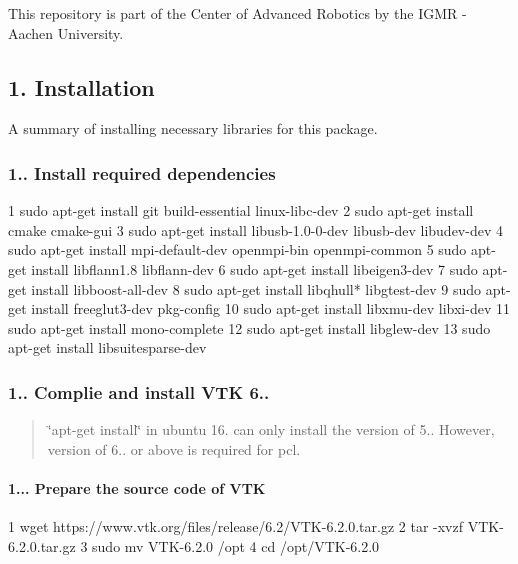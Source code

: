  This repository is part of the Center of Advanced Robotics by the I\+G\+MR -\/ Aachen University. 



\subsection*{1. Installation}

A summary of installing necessary libraries for this package. 



\subsubsection*{1.. Install required dependencies}


\begin{DoxyCode}
1 sudo apt-get install git build-essential linux-libc-dev
2 sudo apt-get install cmake cmake-gui
3 sudo apt-get install libusb-1.0-0-dev libusb-dev libudev-dev
4 sudo apt-get install mpi-default-dev openmpi-bin openmpi-common
5 sudo apt-get install libflann1.8 libflann-dev
6 sudo apt-get install libeigen3-dev
7 sudo apt-get install libboost-all-dev
8 sudo apt-get install libqhull* libgtest-dev
9 sudo apt-get install freeglut3-dev pkg-config
10 sudo apt-get install libxmu-dev libxi-dev
11 sudo apt-get install mono-complete
12 sudo apt-get install libglew-dev
13 sudo apt-get install libsuitesparse-dev
\end{DoxyCode}




\subsubsection*{1.. Complie and install V\+TK 6..}

\begin{quote}
\char`\"{}apt-\/get install\char`\"{} in ubuntu 16. can only install the version of 5.. However, version of 6.. or above is required for pcl. \end{quote}
\paragraph*{1... Prepare the source code of V\+TK}


\begin{DoxyCode}
1 wget https://www.vtk.org/files/release/6.2/VTK-6.2.0.tar.gz
2 tar -xvzf VTK-6.2.0.tar.gz
3 sudo mv VTK-6.2.0 /opt
4 cd /opt/VTK-6.2.0
\end{DoxyCode}


